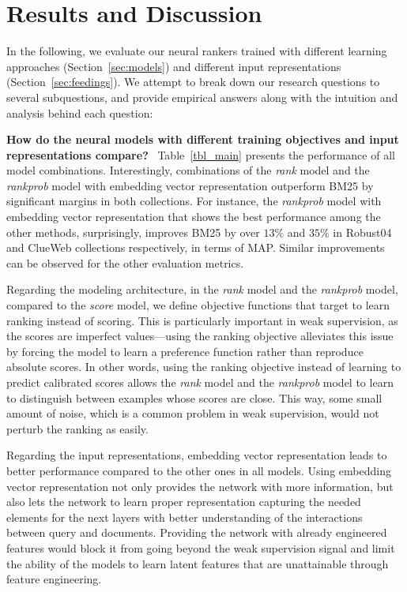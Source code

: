 \documentclass[sigconf]{acmart}
\newcommand{\modelone}{\textit{score} model\xspace}
\newcommand{\modeltwo}{\textit{rank} model\xspace}
\newcommand{\modelthree}{\textit{rank\-prob} model\xspace}
\newcommand{\feedthree}{embedding vector representation\xspace}
\newcommand{\shrink}{\vspace{-1.5ex}}
\def\:{\hskip0pt} %
\newcommand{\mypar}[1]{\vspace*{-0.1ex}\medskip\noindent\textbf{#1}~}
\begin{document}

\shrink
\section{Results and Discussion}
In the following, we evaluate our neural rankers trained with different learning approaches (Section~\ref{sec:models}) and different input representations (Section~\ref{sec:feedings}). We attempt to break down our research questions to several subquestions, and provide empirical answers along with the intuition and analysis behind each question:

\mypar{How do the neural models with different training objectives and input representations compare?}
%
Table~\ref{tbl_main} presents the performance of all model combinations.
Interestingly, combinations of the \modeltwo and the \modelthree with \feedthree outperform BM25 by significant margins in both collections. For instance, the \modelthree with \feedthree that shows the best performance among the other methods, surprisingly, improves BM25 by over $13\%$ and $35\%$ in Robust04 and ClueWeb collections respectively, in terms of MAP. Similar improvements can be observed for the other evaluation metrics.

Regarding the modeling architecture, in the \modeltwo and the \modelthree, compared to the \modelone, we define objective functions that target to learn ranking instead of scoring. This is particularly important in weak supervision, as the scores are imperfect values\:---\:using the ranking objective alleviates this issue by forcing the model to learn a preference function rather than reproduce absolute scores.
%
In other words, using the ranking objective instead of learning to predict calibrated scores allows the \modeltwo and the \modelthree to learn to distinguish between examples whose scores are close. This way, some small amount of noise, which is a common problem in weak supervision, would not perturb the ranking as easily.

Regarding the input representations, \feedthree leads to better performance compared to the other ones in all models.
Using \feedthree not only provides the network with more information, but also lets the network to learn proper representation capturing the needed elements for the next layers with better understanding of the interactions between query and documents. 
Providing the network with already engineered features would block it from going beyond the weak supervision signal and limit the ability of the models to learn latent features that are unattainable through feature engineering. 
\end{document}
